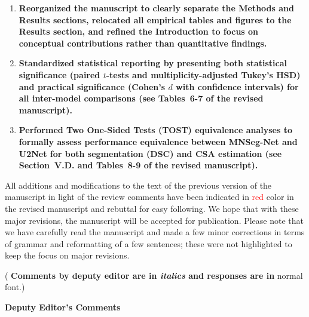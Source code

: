 \documentclass[12pt,letterpaper]{article}
\begin{document}
\begin{enumerate}[leftmargin=*]

 

\item \textbf{Reorganized the manuscript to clearly separate the Methods and Results sections, relocated all empirical tables and figures to the Results section, and refined the Introduction to focus on conceptual contributions rather than quantitative findings.}

\item \textbf{Standardized statistical reporting by presenting both statistical significance (paired $t$-tests and multiplicity-adjusted Tukey’s HSD) and practical significance (Cohen’s $d$ with confidence intervals) for all inter-model comparisons (see  Tables~6-7 of the revised manuscript).}


\item \textbf{Performed Two One-Sided Tests (TOST) equivalence analyses to formally assess performance equivalence between MNSeg-Net and U2Net for both segmentation (DSC) and CSA estimation (see Section~V.D. and  Tables~8-9 of the revised manuscript).}





\end{enumerate}



\begin{enumerate}[leftmargin=*]




\end{enumerate}














\noindent All additions and modifications to the text of the previous version of the manuscript in light of the review comments have been indicated in  \textcolor{red}{red} color in the revised manuscript and rebuttal for easy following. 
We hope that with these major revisions, the manuscript will be accepted for publication. Please note that we have carefully read the manuscript and made a few minor corrections in terms of grammar and reformatting of a few sentences; these were not highlighted to keep the focus on major revisions. \\

\begin{center}
{ ( \bf Comments by deputy editor are in {\it italics} and responses are in} normal font.) \\ 
\end{center}
\begin{center}
{\bf Deputy Editor's Comments}
\end{center}
\end{document}
